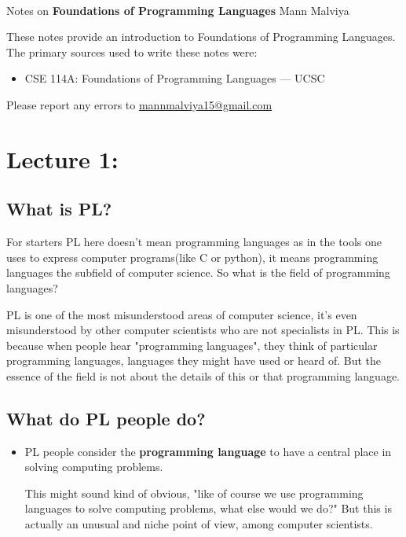 \documentclass[11pt]{article}
\begin{document}
\thispagestyle{empty}
\bigskip \
\vspace{0.1cm}

\begin{center}
{\fontsize{22}{22} \selectfont Notes on}
\vskip 16pt
{\fontsize{20}{20} \selectfont \bf \sffamily Foundations of Programming Languages}
\vskip 24pt
{\fontsize{18}{18} \selectfont \rmfamily Mann Malviya}
\vskip 6pt
{\fontsize{14}{14} \selectfont {}}
\vskip 24pt
\end{center}

{\parindent0pt \baselineskip=15.5pt These notes provide an introduction to Foundations of Programming Languages. The primary sources used to write these notes were:

\begin{itemize}
    \item CSE 114A: Foundations of Programming Languages — UCSC
\end{itemize}

Please report any errors to \href{mailto:mannmalviya15@gmail.com}{mannmalviya15@gmail.com}


}

\newpage
\tableofcontents
\newpage

\section*{Lecture 1:}

\subsection*{What is PL?}
For starters PL here doesn't mean programming languages as in the tools one uses to express computer programs(like C or python), it means programming languages the subfield of computer science. So what is the field of programming languages?

PL is one of the most misunderstood areas of computer science, it's even misunderstood by other computer scientists who are not specialists in PL. This is because when people hear "programming languages", they think of particular programming languages, languages they might have used or heard of. But the essence of the field is not about the details of this or that programming language.

\subsection*{What do PL people do?}
\begin{itemize}
  \item PL people consider the \textbf{programming language} to have a central place in solving computing problems. 
  
  This might sound kind of obvious, "like of course we use programming languages to solve computing problems, what else would we do?" But this is actually an unusual and niche point of view, among computer scientists.
\end{itemize}
\end{document}
